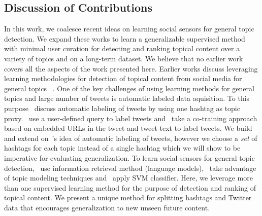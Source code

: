 \subsection*{Discussion of Contributions}
In this work, we coalesce recent ideas on learning social sensors for general topic detection. We expand these works to learn a generalizable supervised method with minimal user curation for detecting and ranking topical content over a variety of topics and on a long-term dataset. We believe that no earlier work covers all the aspects of the work presented here.
Earlier works discuss leveraging learning methodologies for detection of topical content from social media for general topics ~\cite{lin2011smoothing,yang2014large,magdy}. One of the key challenges of using learning methods for general topics and large number of tweets is automatic labeled data aquisition. To this purpose~\cite{lin2011smoothing} discuss automatic labeling of tweets by using one hashtag as topic proxy.~\cite{magdy} use a user-defined query to label tweets and~\cite{yang2014large} take a co-training approach based on embedded URLs in the tweet and tweet text to label tweets. We build and extend on~\cite{lin2011smoothing}'s idea of automatic labeling of tweets, however we choose a \emph{set} of hashtags for each topic instead of a single hashtag which we will show to be imperative for evaluating generalization. To learn social sensors for general topic detection,~\cite{lin2011smoothing} use information retrieval method (language models),~\cite{yang2014large} take advantage of topic modeling techniques and~\cite{magdy} apply SVM classifier. Here, we leverage more than one supervised learning method for the purpose of detection and ranking of topical content. We present a unique method for splitting hashtags and Twitter data that encourages generalization to new unseen future content. 

